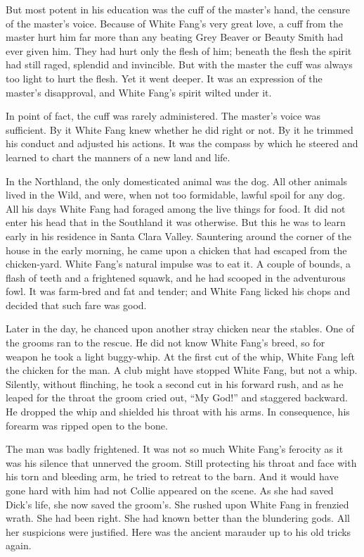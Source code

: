 \documentclass[10pt]{book}
\begin{document}
But most potent in his education was the cuff of the master’s hand, the
censure of the master’s voice. Because of White Fang’s very great love,
a cuff from the master hurt him far more than any beating Grey Beaver
or Beauty Smith had ever given him. They had hurt only the flesh of
him; beneath the flesh the spirit had still raged, splendid and
invincible. But with the master the cuff was always too light to hurt
the flesh. Yet it went deeper. It was an expression of the master’s
disapproval, and White Fang’s spirit wilted under it.

In point of fact, the cuff was rarely administered. The master’s voice
was sufficient. By it White Fang knew whether he did right or not. By
it he trimmed his conduct and adjusted his actions. It was the compass
by which he steered and learned to chart the manners of a new land and
life.

In the Northland, the only domesticated animal was the dog. All other
animals lived in the Wild, and were, when not too formidable, lawful
spoil for any dog. All his days White Fang had foraged among the live
things for food. It did not enter his head that in the Southland it was
otherwise. But this he was to learn early in his residence in Santa
Clara Valley. Sauntering around the corner of the house in the early
morning, he came upon a chicken that had escaped from the chicken-yard.
White Fang’s natural impulse was to eat it. A couple of bounds, a flash
of teeth and a frightened squawk, and he had scooped in the adventurous
fowl. It was farm-bred and fat and tender; and White Fang licked his
chops and decided that such fare was good.

Later in the day, he chanced upon another stray chicken near the
stables. One of the grooms ran to the rescue. He did not know White
Fang’s breed, so for weapon he took a light buggy-whip. At the first
cut of the whip, White Fang left the chicken for the man. A club might
have stopped White Fang, but not a whip. Silently, without flinching,
he took a second cut in his forward rush, and as he leaped for the
throat the groom cried out, “My God!” and staggered backward. He
dropped the whip and shielded his throat with his arms. In consequence,
his forearm was ripped open to the bone.

The man was badly frightened. It was not so much White Fang’s ferocity
as it was his silence that unnerved the groom. Still protecting his
throat and face with his torn and bleeding arm, he tried to retreat to
the barn. And it would have gone hard with him had not Collie appeared
on the scene. As she had saved Dick’s life, she now saved the groom’s.
She rushed upon White Fang in frenzied wrath. She had been right. She
had known better than the blundering gods. All her suspicions were
justified. Here was the ancient marauder up to his old tricks again.
\end{document}
